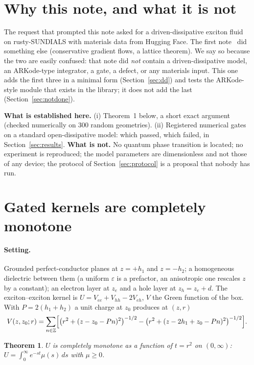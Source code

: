 \documentclass[11pt,a4paper]{article}
\newtheorem{theorem}{Theorem}
\begin{document}
\section{Why this note, and what it is not}

The request that prompted this note asked for a driven-dissipative exciton fluid on rusty-SUNDIALS with materials data from Hugging Face.
The first note~\cite{CallensExciton1} did something else (conservative gradient flows, a lattice theorem). We say so
because the two are easily confused: that note did \emph{not} contain a driven-dissipative model, an ARKode-type integrator, a
gate, a defect, or any materials input. This one adds the first three in a minimal form (Section~\ref{sec:dd}) and tests the
ARKode-style module that exists in the library; it does not add the last (Section~\ref{sec:notdone}).

\begin{keybox}
\textbf{What is established here.} (i) Theorem~1 below, a short exact argument (checked numerically on 300 random geometries).
(ii) Registered numerical gates on a standard open-dissipative model: which passed, which failed, in
Section~\ref{sec:results}. \textbf{What is not.} No quantum phase transition is located; no experiment is
reproduced; the model parameters are dimensionless and not those of any device; the protocol of Section~\ref{sec:protocol} is a
proposal that nobody has run.
\end{keybox}

\section{Gated kernels are completely monotone}\label{sec:cm}

\paragraph{Setting.} Grounded perfect-conductor planes at $z=+h_1$ and $z=-h_2$; a homogeneous dielectric between them (a uniform
$\varepsilon$ is a prefactor, an anisotropic one rescales $z$ by a constant); an electron layer at $z_e$ and a hole layer at
$z_h=z_e+d$. The exciton--exciton kernel is $U=V_{ee}+V_{hh}-2V_{eh}$, $V$ the Green function of the box. With
$P=2(h_1+h_2)$ a unit charge at $z_0$ produces at $(z,r)$
\[
V(z,z_0;r)=\sum_{n\in\mathbb Z}\Bigl[\bigl(r^2+(z-z_0-Pn)^2\bigr)^{-1/2}-\bigl(r^2+(z-2h_1+z_0-Pn)^2\bigr)^{-1/2}\Bigr].
\]

\begin{theorem}\label{thm:cm}
$U$ is completely monotone as a function of $t=r^2$ on $(0,\infty)$: $U=\int_0^\infty e^{-st}\mu(s)\,ds$ with $\mu\geq0$.
\end{theorem}
\end{document}
